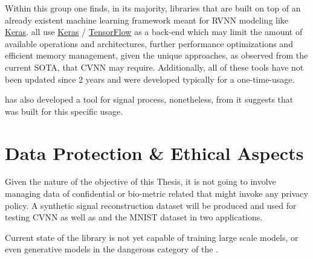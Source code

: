 Within this group one finds, in its majority, libraries that are built on top of an already existent machine learning framework meant for RVNN modeling like \href{https://keras.io/}{Keras}. \parencite{trabelsi2017tool, cruz4252610rosenpy, j_agustin_barrachina_2022_7303587, dramsch2019complex, barrachina2023theory} all use \href{https://keras.io/}{Keras} / \href{https://www.tensorflow.org/}{TensorFlow} as a back-end which may limit the amount of available operations and architectures, further performance optimizations and efficient memory management, given the unique approaches, as observed from the current \gls{SOTA}, that \gls{CVNN} may require. Additionally, all of these tools have not been updated since 2 years and were developed typically for a one-time-usage.

\textcite{peker2015tool} has also developed a tool for signal process, nonetheless, from \parencite{peker2016eegsignal} it suggests that was built for this specific usage.

\section{Data Protection \& Ethical Aspects}
Given the nature of the objective of this Thesis, it is not going to involve managing data of confidential or bio-metric related that might invoke any privacy policy. A synthetic signal reconstruction dataset will be produced and used for testing CVNN as well as and the MNIST dataset \parencite{lecun1998mnist} in two applications.

Current state of the library is not yet capable of training large scale models,
or even generative models in the dangerous category of the \textcite{euai2021}.